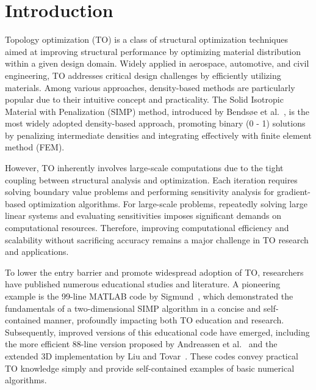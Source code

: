 \documentclass[mathpazo]{cicp}
\begin{document}
\section{Introduction}
Topology optimization (TO) is a class of structural optimization techniques aimed at improving structural performance by optimizing material distribution within a given design domain. Widely applied in aerospace, automotive, and civil engineering, TO addresses critical design challenges by efficiently utilizing materials. Among various approaches, density-based methods are particularly popular due to their intuitive concept and practicality. The Solid Isotropic Material with Penalization (SIMP) method, introduced by Bendsøe et al.~\cite{Bendsøe2004}, is the most widely adopted density-based approach, promoting binary (0 - 1) solutions by penalizing intermediate densities and integrating effectively with finite element method (FEM).

However, TO inherently involves large-scale computations due to the tight coupling between structural analysis and optimization. Each iteration requires solving boundary value problems and performing sensitivity analysis for gradient-based optimization algorithms. For large-scale problems, repeatedly solving large linear systems and evaluating sensitivities imposes significant demands on computational resources. Therefore, improving computational efficiency and scalability without sacrificing accuracy remains a major challenge in TO research and applications.

To lower the entry barrier and promote widespread adoption of TO, researchers have published numerous educational studies and literature. A pioneering example is the 99-line MATLAB code by Sigmund~\cite{sigmund200199}, which demonstrated the fundamentals of a two-dimensional SIMP algorithm in a concise and self-contained manner, profoundly impacting both TO education and research. Subsequently, improved versions of this educational code have emerged, including the more efficient 88-line version proposed by Andreassen et al.~\cite{andreassen2011efficient} and the extended 3D implementation by Liu and Tovar~\cite{liu2014efficient}. These codes convey practical TO knowledge simply and provide self-contained examples of basic numerical algorithms.
\end{document}
